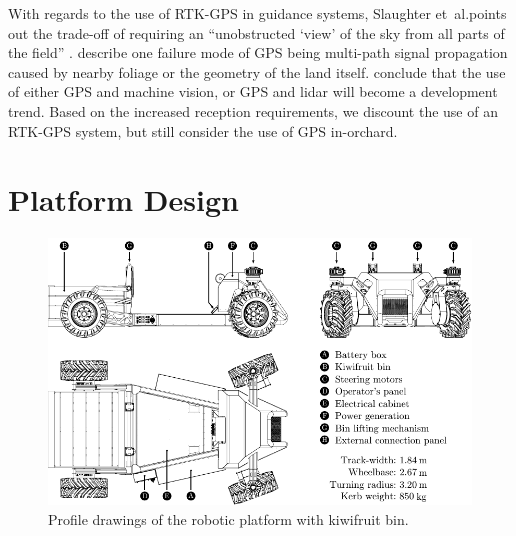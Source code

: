 \documentclass[preprint,authoryear,12pt]{elsarticle}
\begin{document}
        With regards to the use of RTK-GPS in guidance systems, Slaughter et~al.\@ points out the trade-off of requiring an ``unobstructed `view' of the sky from all parts of the field'' \citep{Slaughter2008}.
        \cite{Durrant-Whyte2005} describe one failure mode of GPS being multi-path signal propagation caused by nearby foliage or the geometry of the land itself.
        \cite{Li2009} conclude that the use of either GPS and machine vision, or GPS and lidar will become a development trend.
        Based on the increased reception requirements, we discount the use of an RTK-GPS system, but still consider the use of GPS in-orchard.

\section{Platform Design}
\label{sect:design}

        \begin{figure}[htb]
            \centering
            \includegraphics[width=\linewidth]{imgs/profile_views/AMMP-All-Labelled.pdf}
            \caption{Profile drawings of the robotic platform with kiwifruit bin.}
            \label{fig:AMMP}
        \end{figure}
\end{document}
